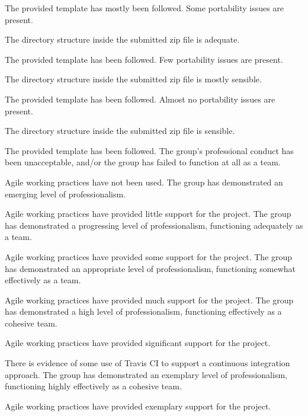 \documentclass{../fal_assignment}
\begin{document}
\begin{markingrubric}
            \par The provided template has mostly been followed.
        \grade Some portability issues are present.
            \par The directory structure inside the submitted zip file is adequate.
            \par The provided template has been followed.
        \grade Few portability issues are present.
            \par The directory structure inside the submitted zip file is mostly sensible.
            \par The provided template has been followed.
        \grade Almost no portability issues are present.
            \par The directory structure inside the submitted zip file is sensible.
            \par The provided template has been followed.
%
        \grade\fail The group's professional conduct has been unacceptable,
            and/or the group has failed to function at all as a team.
            \par Agile working practices have not been used.
        \grade The group has demonstrated an emerging level of professionalism.
            \par Agile working practices have provided little support for the project.
        \grade The group has demonstrated a progressing level of professionalism,
            functioning adequately as a team.
            \par Agile working practices have provided some support for the project.
        \grade The group has demonstrated an appropriate level of professionalism,
            functioning somewhat effectively as a team.
            \par Agile working practices have provided much support for the project.
        \grade The group has demonstrated a high level of professionalism,
            functioning effectively as a cohesive team.
            \par Agile working practices have provided significant support for the project.
            \par There is evidence of some use of Travis CI to support a continuous integration approach.
        \grade The group has demonstrated an exemplary level of professionalism,
            functioning highly effectively as a cohesive team.
            \par Agile working practices have provided exemplary support for the project.

\end{markingrubric}
\end{document}
